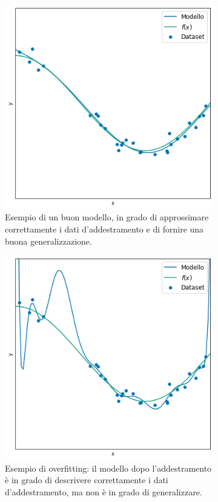 \documentclass[../../main.tex]{subfiles}
\begin{document}
\begin{figure}[H]
\begin{subfigure}[t]{0.30\textwidth}
        \includegraphics[width=\textwidth]{immagini/4_2/4_2_3/good.png}
        \caption{Esempio di un buon modello, in grado di approssimare correttamente i dati d'addestramento e di fornire una buona generalizzazione.}
        \label{fig:goodfitting}
    \end{subfigure}
    \begin{subfigure}[t]{0.30\textwidth}
        \centering
        \includegraphics[width=\textwidth]{immagini/4_2/4_2_3/over.png}
        \caption{Esempio di overfitting: il modello dopo l'addestramento è in grado di descrivere correttamente i dati d'addestramento, ma non è in grado di generalizzare.}
        \label{fig:overfitting}
    \end{subfigure}
    \caption{}
\end{figure}
\end{document}
